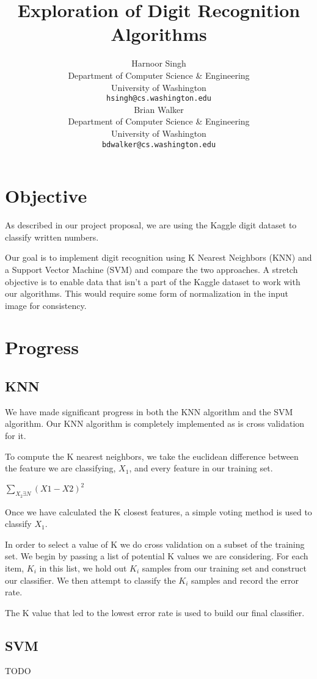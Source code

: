 \documentclass{article} %
\title{Exploration of Digit Recognition Algorithms}
\author{
Harnoor Singh \\
Department of Computer Science \& Engineering\\
University of Washington \\
\texttt{hsingh@cs.washington.edu} \\
\And
Brian Walker \\
Department of Computer Science \& Engineering \\
University of Washington \\
\texttt{bdwalker@cs.washington.edu} \\
}
\begin{document}
\maketitle

\section{Objective}

As described in our project proposal, we are using the Kaggle digit dataset to classify written numbers.

Our goal is to implement digit recognition using K Nearest Neighbors (KNN) and a Support Vector Machine (SVM) and compare the two approaches. A stretch objective is to enable data that isn't a part of the Kaggle dataset to work with our algorithms. This would require some form of normalization in the input image for consistency.

\section{Progress}

\subsection{KNN}

We have made significant progress in both the KNN algorithm and the SVM algorithm. Our KNN algorithm is completely implemented as is cross validation for it. 

To compute the K nearest neighbors, we take the euclidean difference between the feature we are classifying, $X_1$, and every feature in our training set.

\begin{center}
$\sum\limits_{X_2 \exists N} {(X1 - X2)^2}$
\end{center}

Once we have calculated the K closest features, a simple voting method is used to classify $X_1$.

In order to select a value of K we do cross validation on a subset of the training set. We begin by passing a list of potential K values we are considering. For each item, $K_i$ in this list, we hold out $K_i$ samples from our training set and construct our classifier. We then attempt to classify the $K_i$ samples and record the error rate. 

The K value that led to the lowest error rate is used to build our final classifier.

\subsection{SVM}

TODO

\begingroup
\renewcommand{\section}[2]{}%

	
\endgroup
\end{document}
